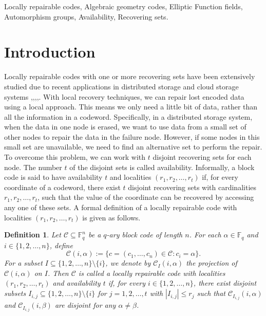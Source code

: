 \documentclass[journal,12pt,onecolumn]{IEEEtran}
\newtheorem{definition}{Definition}
\begin{document}
\begin{IEEEkeywords}
Locally repairable codes, Algebraic geometry codes, Elliptic Function fields, Automorphism groups, Availability, Recovering sets.
\end{IEEEkeywords}


\section{Introduction}

Locally repairable codes with one or more recovering sets have been extensively studied due to recent applications in distributed storage and cloud storage systems \cite{4557599},\cite{On_the_Locality_of_Codeword_Symbols},\cite{6818438},\cite{FORBES201478},\cite{8493531}. With local recovery techniques, we can repair lost encoded data using a local approach. This means we only need a little bit of data, rather than all the information in a codeword. Specifically, in a distributed storage system, when the data in one node is erased, we want to use data from a small set of other nodes to repair the data in the failure node. However, if some nodes in this small set are unavailable, we need to find an alternative set to perform the repair. To overcome this problem, we can work with \(t\) disjoint recovering sets for each node. The number \(t\) of the disjoint sets is called availability. Informally, a block code is said to have availability $t$ and localities \((r_1, r_2, \ldots, r_t)\) if, for every coordinate of a codeword, there exist \(t\) disjoint recovering sets with cardinalities \(r_1, r_2, \ldots, r_t\), such that the value of the coordinate can be recovered by accessing any one of these sets. A formal definition of a locally repairable code with localities \((r_1, r_2, \ldots, r_t)\) is given as follows.
\begin{definition}
    Let \( \mathcal{C} \subseteq \mathbb{F}_q^n \) be a \( q \)-ary block code of length \( n \). For each \( \alpha \in \mathbb{F}_q \) and \( i \in \{1, 2, \dots, n\} \), define  
    \[
        \mathcal{C}(i, \alpha) := \big\{c = (c_1, \dots, c_n) \in \mathcal{C} : c_i = \alpha\big\}.
    \]
    For a subset \( I \subseteq \{1, 2, \dots, n\} \setminus \{i\} \), we denote by \( \mathcal{C}_I(i, \alpha) \) the projection of \( \mathcal{C}(i, \alpha) \) on \( I \). Then \( \mathcal{C} \) is called a locally repairable code with localities \((r_1, r_2, \dots, r_t)\) and availability \( t \) if, for every \( i \in \{1, 2, \dots, n\} \), there exist disjoint subsets \( I_{i,j} \subseteq \{1, 2, \dots, n\} \setminus \{i\} \) for \( j = 1, 2, \dots, t \) with \( |I_{i,j}| \leq r_j \) such that \( \mathcal{C}_{I_{i,j}}(i, \alpha) \) and \( \mathcal{C}_{I_{i,j}}(i, \beta) \) are disjoint for any \( \alpha \neq \beta \).
\end{definition}
\end{document}
